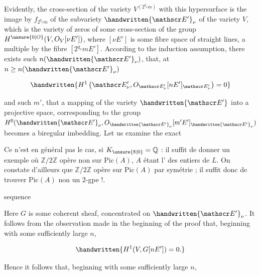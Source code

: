 Evidently, the cross-section of the variety $V^{(2^{q_o}m)}$
with this hypersurface is the image by $f_{2^{q_o}m}$ of the
subvariety $\handwritten{\mathscr E'}_\nu$ of the variety $V$, which is the variety of
zeros of some cross-section of the group $H^{\unsure{0|O}}(V,O_V[\nu  E'])$,
where $[\nu  E']$ is some fibre space of straight lines, a
multiple by the fibre $[2^{q_o}mE']$. According to the induction
assumption, there exists such $n(\handwritten{\mathscr E'}_\nu)$, that, at $n\geq n(\handwritten{\mathscr E'}_\nu)$

\[
\handwritten{H^1\left(\mathscr E'_\nu,O_{\mathscr E'_\nu}[nE']_{\mathscr E'_\nu}\right)=0}
\]

and such $m'$, that a mapping of the variety $\handwritten{\mathscr E'}$ into a
projective space, corresponding to the group $H^0(\handwritten{\mathscr E'}_\nu,O_{\handwritten{\mathscr E'}_\nu}[m'E']_{\handwritten{\mathscr E'}_\nu})$
becomes a biregular imbedding. Let us examine the exact



Ce n'est en général pas le cas,  si
$K_{\unsure{8|0}}=\mathbb Q$ : il suffit de donner un exemple où
$\mathbb Z/2\mathbb Z$ opère non  sur $\mathrm{Pic}(A)$, $A$ étant l'
 des entiers de $L$. On constate d'ailleurs que
$\mathbb Z/2\mathbb Z$ opère sur $\mathrm{Pic}(A)$ par symétrie ; il suffit donc
de trouver $\mathrm{Pic}(A)$ non un $2$-gpe !.



sequence


Here $G$ is some coherent sheaf, concentrated on $\handwritten{\mathscr E'}_\nu$.
It follows from the observation made in the beginning of
the proof that, beginning with some sufficiently large $n$,

\[
\handwritten{H^1(V,G[nE'])=0.}
\]

Hence it follows that, beginning with some sufficiently
large $n$,


